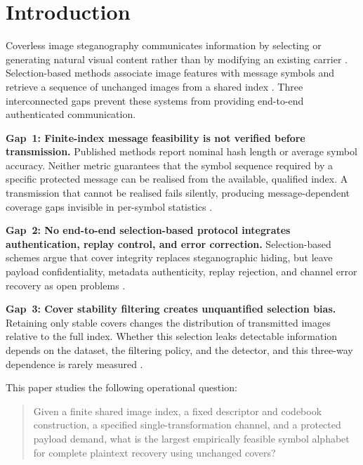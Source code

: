 ﻿\documentclass[a4paper,fleqn]{cas-dc}
\begin{document}
\maketitle

\section{Introduction}
\label{sec:introduction}

Coverless image steganography communicates information by selecting or
generating natural visual content rather than by modifying an existing
carrier \cite{zhou2015coverless,meng2024review}. Selection-based methods
associate image features with message symbols and retrieve a sequence of
unchanged images from a shared index \cite{zheng2017hashing,li2024surf}.
Three interconnected gaps prevent these systems from providing end-to-end
authenticated communication.

\textbf{Gap~1: Finite-index message feasibility is not verified before
transmission.} Published methods report nominal hash length or average symbol
accuracy. Neither metric guarantees that the symbol sequence required by a
specific protected message can be realised from the available, qualified
index. A transmission that cannot be realised fails silently, producing
message-dependent coverage gaps invisible in per-symbol statistics
\cite{zhou2015coverless,abdulsattar2021,meng2024review}.

\textbf{Gap~2: No end-to-end selection-based protocol integrates
authentication, replay control, and error correction.} Selection-based
schemes argue that cover integrity replaces steganographic hiding, but
leave payload confidentiality, metadata authenticity, replay rejection,
and channel error recovery as open problems
\cite{zheng2017hashing,li2024surf,guo2025diverse,guo2026capacity}.

\textbf{Gap~3: Cover stability filtering creates unquantified selection
bias.} Retaining only stable covers changes the distribution of transmitted
images relative to the full index. Whether this selection leaks detectable
information depends on the dataset, the filtering policy, and the detector,
and this three-way dependence is rarely measured
\cite{fridrich2012rich,cachin1998steganography}.

This paper studies the following operational question:

\begin{quote}
Given a finite shared image index, a fixed descriptor and codebook
construction, a specified single-transformation channel, and a protected
payload demand, what is the largest empirically feasible symbol alphabet for
complete plaintext recovery using unchanged covers?
\end{quote}
\end{document}
